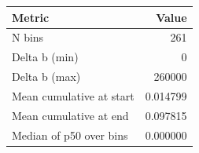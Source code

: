\begin{tabular}{lr}\hline
Metric & Value \\ \hline
N bins & 261 \\ 
Delta b (min) & 0 \\ 
Delta b (max) & 260000 \\ 
Mean cumulative at start & 0.014799 \\ 
Mean cumulative at end & 0.097815 \\ 
Median of p50 over bins & 0.000000 \\ 
\hline\end{tabular}
